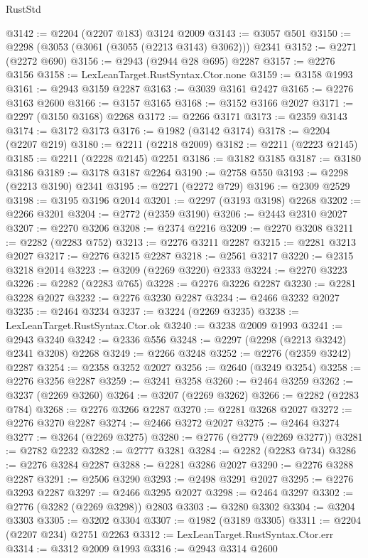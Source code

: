 \begin{lexlean}{RustStd}
\begin{coremodule}
@3142 := @2204 (@2207 @183) @3124 @2009
@3143 := @3057 @501
@3150 := @2298 (@3053 (@3061 (@3055 (@2213 @3143) @3062))) @2341
@3152 := @2271 (@2272 @690)
@3156 := @2943 (@2944 @28 @695) @2287
@3157 := @2276 @3156
@3158 := LexLeanTarget.RustSyntax.Ctor.none
@3159 := @3158 @1993
@3161 := @2943 @3159 @2287
@3163 := @3039 @3161 @2427
@3165 := @2276 @3163 @2600
@3166 := @3157 @3165
@3168 := @3152 @3166 @2027
@3171 := @2297 (@3150 @3168) @2268
@3172 := @2266 @3171
@3173 := @2359 @3143
@3174 := @3172 @3173
@3176 := @1982 (@3142 @3174)
@3178 := @2204 (@2207 @219)
@3180 := @2211 (@2218 @2009)
@3182 := @2211 (@2223 @2145)
@3185 := @2211 (@2228 @2145) @2251
@3186 := @3182 @3185
@3187 := @3180 @3186
@3189 := @3178 @3187 @2264
@3190 := @2758 @550
@3193 := @2298 (@2213 @3190) @2341
@3195 := @2271 (@2272 @729)
@3196 := @2309 @2529
@3198 := @3195 @3196 @2014
@3201 := @2297 (@3193 @3198) @2268
@3202 := @2266 @3201
@3204 := @2772 (@2359 @3190)
@3206 := @2443 @2310 @2027
@3207 := @2270 @3206
@3208 := @2374 @2216
@3209 := @2270 @3208
@3211 := @2282 (@2283 @752)
@3213 := @2276 @3211 @2287
@3215 := @2281 @3213 @2027
@3217 := @2276 @3215 @2287
@3218 := @2561 @3217
@3220 := @2315 @3218 @2014
@3223 := @3209 (@2269 @3220) @2333
@3224 := @2270 @3223
@3226 := @2282 (@2283 @765)
@3228 := @2276 @3226 @2287
@3230 := @2281 @3228 @2027
@3232 := @2276 @3230 @2287
@3234 := @2466 @3232 @2027
@3235 := @2464 @3234
@3237 := @3224 (@2269 @3235)
@3238 := LexLeanTarget.RustSyntax.Ctor.ok
@3240 := @3238 @2009 @1993
@3241 := @2943 @3240
@3242 := @2336 @556
@3248 := @2297 (@2298 (@2213 @3242) @2341 @3208) @2268
@3249 := @2266 @3248
@3252 := @2276 (@2359 @3242) @2287
@3254 := @2358 @3252 @2027
@3256 := @2640 (@3249 @3254)
@3258 := @2276 @3256 @2287
@3259 := @3241 @3258
@3260 := @2464 @3259
@3262 := @3237 (@2269 @3260)
@3264 := @3207 (@2269 @3262)
@3266 := @2282 (@2283 @784)
@3268 := @2276 @3266 @2287
@3270 := @2281 @3268 @2027
@3272 := @2276 @3270 @2287
@3274 := @2466 @3272 @2027
@3275 := @2464 @3274
@3277 := @3264 (@2269 @3275)
@3280 := @2776 (@2779 (@2269 @3277))
@3281 := @2782 @2232
@3282 := @2777 @3281
@3284 := @2282 (@2283 @734)
@3286 := @2276 @3284 @2287
@3288 := @2281 @3286 @2027
@3290 := @2276 @3288 @2287
@3291 := @2506 @3290
@3293 := @2498 @3291 @2027
@3295 := @2276 @3293 @2287
@3297 := @2466 @3295 @2027
@3298 := @2464 @3297
@3302 := @2776 (@3282 (@2269 @3298)) @2803
@3303 := @3280 @3302
@3304 := @3204 @3303
@3305 := @3202 @3304
@3307 := @1982 (@3189 @3305)
@3311 := @2204 (@2207 @234) @2751 @2263
@3312 := LexLeanTarget.RustSyntax.Ctor.err
@3314 := @3312 @2009 @1993
@3316 := @2943 @3314 @2600

\end{coremodule}
\end{lexlean}
